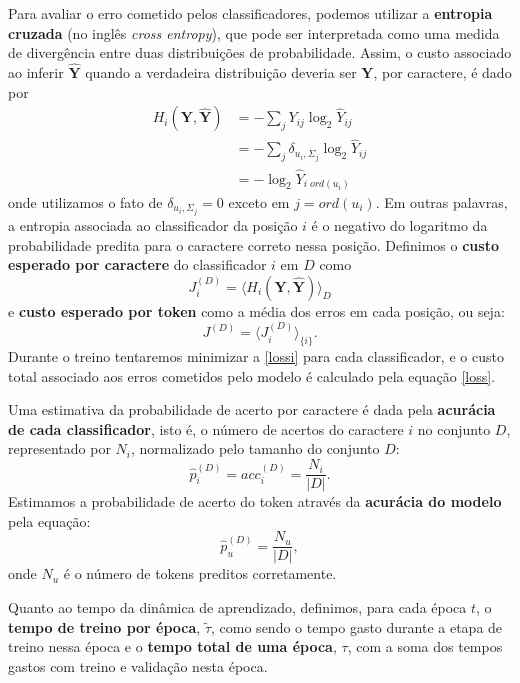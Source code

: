 Para avaliar o erro cometido pelos classificadores, podemos utilizar a \textbf{entropia cruzada} (no inglês \textit{cross entropy}), que pode ser interpretada como uma medida de divergência entre duas distribuições de probabilidade. Assim, o custo associado ao inferir $\hat{\mathbf{Y}}$ quando a verdadeira distribuição deveria ser $\mathbf{Y}$, por caractere, é dado por
\begin{align}
	H_i(\mathbf{Y}, \hat{\mathbf{Y}}) &= 
					-\sum_j Y_{ij} \log_2{\hat{Y}_{ij}} \\
					&= -\sum_j \delta_{u_i, \Sigma_{j}} \log_2{\hat{Y}_{ij}} \\
					&= -\log_2{\hat{Y}_{i\;ord(u_i)}}
\end{align}
onde utilizamos o fato de $\delta_{u_i, \Sigma_{j}} = 0$ exceto em $j = ord(u_i)$. Em outras palavras, a entropia associada ao classificador da posição $i$ é o negativo do logaritmo da probabilidade predita para o caractere correto nessa posição. Definimos o \textbf{custo esperado por caractere} do classificador $i$ em $D$ como 
\begin{equation} \label{lossi} 
	J_i^{(D)} = \langle H_i(\mathbf{Y}, \hat{\mathbf{Y}}) \rangle_D
\end{equation}
e \textbf{custo esperado por token} como a média dos erros em cada posição, ou seja:
\begin{equation} \label{loss}
	J^{(D)} = \langle J_i^{(D)} \rangle_{\{i\}} .
\end{equation}
Durante o treino tentaremos minimizar a \ref{lossi} para cada classificador, e o custo total associado aos erros cometidos pelo modelo é calculado pela equação \ref{loss}.

Uma estimativa da probabilidade de acerto por caractere é dada pela \textbf{acurácia de cada classificador}, isto é, o número de acertos do caractere $i$ no conjunto $D$, representado por $N_i$, normalizado pelo tamanho do conjunto $D$: 
\begin{equation}
	\hat{p}_i^{(D)} = acc_i^{(D)} = \frac{N_i}{|D|}.
\end{equation}
Estimamos a probabilidade de acerto do token através da \textbf{acurácia do modelo} pela equação:
\begin{equation} \label{eq:accw}
	\hat{p}_u^{(D)} = \frac{N_u}{|D|},
\end{equation}
onde $N_u$ é o número de tokens preditos corretamente.

Quanto ao tempo da dinâmica de aprendizado, definimos, para cada época $t$, o \textbf{tempo de treino por época}, $\tilde{\tau}$, como sendo o tempo gasto durante a etapa de treino nessa época e o \textbf{tempo total de uma época}, $\tau$, com a soma dos tempos gastos com treino e validação nesta época.